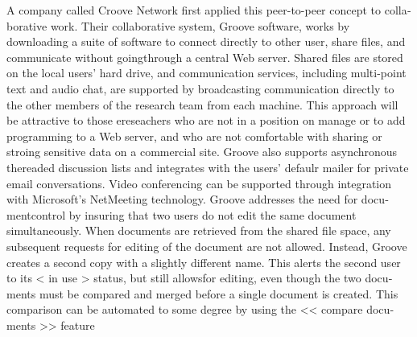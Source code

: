 \begin{latin}
A company called Croove Network first applied this peer-to-peer concept to collaborative work. Their collaborative system, Groove software, works by downloading a suite of software to connect directly to other user, share files, and communicate without goingthrough a central Web server. Shared files are stored on the local users' hard drive, and communication services, including multi-point text and audio chat, are supported by broadcasting communication directly to the other members of the research team from each machine. This approach will be attractive to those ereseachers who are not in a position on manage or to add programming to a Web server, and who are not comfortable with sharing or stroing sensitive data on a commercial site. Groove also supports asynchronous thereaded discussion lists and integrates with the users' defaulr mailer for private email conversations. Video conferencing can  be supported  through integration with Microsoft's NetMeeting technology. Groove addresses the need for documentcontrol by insuring that two users do not edit the same document  simultaneously. When documents are retrieved from the shared file space, any subsequent requests for  editing of the document are not allowed. Instead, Groove creates a second copy with a slightly different name. This alerts the second user to its < in use >  status, but still allowsfor editing, even though the two documents must be compared  and merged before a single document is created. This comparison can be automated to some degree by using the << compare documents >> feature















\end{latin}












